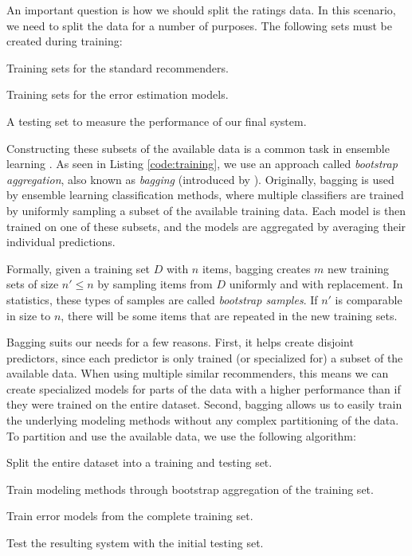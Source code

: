 An important question is how we should split the ratings data.
In this scenario, we need to split the data for a number of purposes.
The following sets must be created during training:

\begin{enumerate*}
  \item Training sets for the standard recommenders.
  \item Training sets for the error estimation models.
  \item A testing set to measure the performance of our final system.
\end{enumerate*}

Constructing these subsets of the available data is a common task in ensemble learning
\cite[p7]{Polikar2006}.
As seen in Listing \ref{code:training}, we use an approach called 
\emph{bootstrap aggregation}, also known as \emph{bagging}
(introduced by \cite{Breiman1996}).
Originally, bagging is used by ensemble learning classification methods, where multiple classifiers are 
trained by uniformly sampling a subset of the available training data. 
Each model is then trained on one of these subsets, and the models are aggregated by averaging their individual predictions.

Formally, given a training set $D$ with $n$ items, bagging creates $m$ new training sets of size $n' \leq n$ by sampling
items from $D$ uniformly and with replacement. 
In statistics, these types of samples are called \emph{bootstrap samples}.
If $n'$ is comparable in size to $n$, there will be some items
that are repeated in the new training sets.

Bagging suits our needs for a few reasons. First, it helps create disjoint predictors, 
since each predictor is only trained (or specialized for) a subset of the available data.
When using multiple similar recommenders, this means we can create specialized models
for parts of the data with a higher performance than if they were trained on the entire dataset.
Second, bagging allows us to easily train the underlying modeling methods without any complex partitioning of the data.
To partition and use the available data, we use the following algorithm:

\begin{enumerate*}
  \item Split the entire dataset into a training and testing set.
  \item Train modeling methods through bootstrap aggregation of the training set.
  \item Train error models from the complete training set.
  \item Test the resulting system with the initial testing set.
\end{enumerate*}


